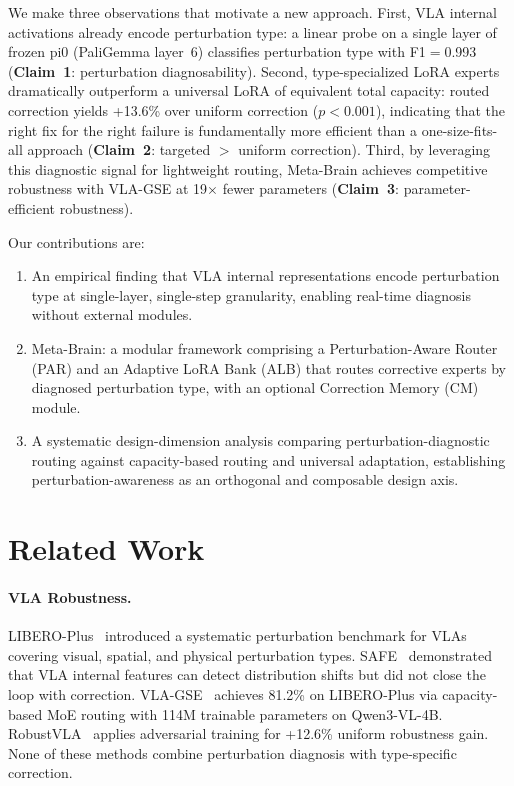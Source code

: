 \documentclass[conference]{article}
\newcommand{\ours}{Meta-Brain}
\newcommand{\liberoplus}{LIBERO-Plus}
\begin{document}
We make three observations that motivate a new approach.
First, VLA internal activations already encode perturbation type: a linear probe on a single layer of frozen pi0 (PaliGemma layer~6) classifies perturbation type with F1$=$0.993 (\textbf{Claim~1}: perturbation diagnosability).
Second, type-specialized LoRA experts dramatically outperform a universal LoRA of equivalent total capacity: routed correction yields +13.6\% over uniform correction ($p<0.001$), indicating that the right fix for the right failure is fundamentally more efficient than a one-size-fits-all approach (\textbf{Claim~2}: targeted $>$ uniform correction).
Third, by leveraging this diagnostic signal for lightweight routing, \ours{} achieves competitive robustness with VLA-GSE at 19$\times$ fewer parameters (\textbf{Claim~3}: parameter-efficient robustness).

Our contributions are:
\begin{enumerate}
  \item An empirical finding that VLA internal representations encode perturbation type at single-layer, single-step granularity, enabling real-time diagnosis without external modules.
  \item \ours{}: a modular framework comprising a Perturbation-Aware Router (PAR) and an Adaptive LoRA Bank (ALB) that routes corrective experts by diagnosed perturbation type, with an optional Correction Memory (CM) module.
  \item A systematic design-dimension analysis comparing perturbation-diagnostic routing against capacity-based routing and universal adaptation, establishing perturbation-awareness as an orthogonal and composable design axis.
\end{enumerate}

\section{Related Work}

\paragraph{VLA Robustness.}
\liberoplus{}~\cite{libero-plus} introduced a systematic perturbation benchmark for VLAs covering visual, spatial, and physical perturbation types.
SAFE~\cite{safe} demonstrated that VLA internal features can detect distribution shifts but did not close the loop with correction.
VLA-GSE~\cite{vla-gse} achieves 81.2\% on \liberoplus{} via capacity-based MoE routing with 114M trainable parameters on Qwen3-VL-4B.
RobustVLA~\cite{robustvla} applies adversarial training for +12.6\% uniform robustness gain.
None of these methods combine perturbation diagnosis with type-specific correction.
\end{document}
